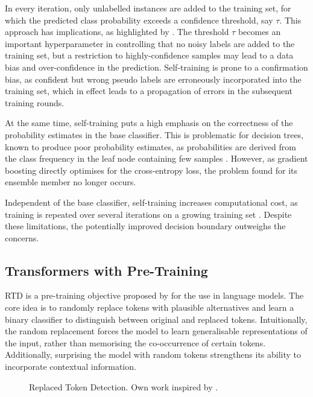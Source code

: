 In every iteration, only unlabelled instances are added to the training set, for which the predicted class probability exceeds a confidence threshold, say $\tau$. This approach has implications, as highlighted by \textcite[][2]{chenDebiasedSelfTrainingSemiSupervised2022}. The threshold $\tau$ becomes an important hyperparameter in controlling that no noisy labels are added to the training set, but a restriction to highly-confidence samples may lead to a data bias and over-confidence in the prediction. Self-training is prone to a confirmation bias, as confident but wrong pseudo labels are erroneously incorporated into the training set, which in effect leads to a propagation of errors in the subsequent training rounds.

At the same time, self-training puts a high emphasis on the correctness of the probability estimates in the base classifier. This is problematic for decision trees, known to produce poor probability estimates, as probabilities are derived from the class frequency in the leaf node containing few samples \autocite[][357--358]{tanhaSemisupervisedSelftrainingDecision2017}. However, as gradient boosting directly optimises for the cross-entropy loss, the problem found for its ensemble member no longer occurs.

Independent of the base classifier, self-training increases computational cost, as training is repeated over several iterations on a growing training set \autocite[][9]{zophRethinkingPretrainingSelftraining2020}. Despite these limitations, the potentially improved decision boundary outweighs the concerns.

\subsection{Transformers with Pre-Training}\label{sec:extensions-to-transformer}

\gls{RTD} is a pre-training objective proposed by \textcite[][2--3]{clarkElectraPretrainingText2020} for the use in language models. The core idea is to randomly replace tokens with plausible alternatives and learn a binary classifier to distinguish between original and replaced tokens. Intuitionally, the random replacement forces the model to learn generalisable representations of the input, rather than memorising the co-occurrence of certain tokens. Additionally, surprising the model with random tokens strengthens its ability to incorporate contextual information.

\begin{figure}[ht]
    \centering
    {\renewcommand\normalsize{\small}
        \normalsize
        }
    \caption[Replaced Token Detection]{Replaced Token Detection. Own work inspired by \autocite[][2--3]{clarkElectraPretrainingText2020}.}
    \label{fig:random-token-replacement}
\end{figure}


